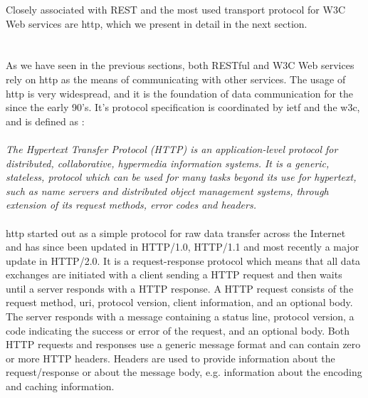Closely associated with REST and the most used transport protocol for W3C Web
services are \gls{http}, which we present in detail in the next section.


\section{}

As we have seen in the previous sections, both RESTful and W3C Web services rely
on \gls{http} as the means of communicating with other services. The usage of
\gls{http} is very widespread, and it is the foundation of data communication
for the  since the early 90's. It's protocol specification is
coordinated by \gls{ietf} and the \gls{w3c}, and is defined as \cite{rfc-2616}:

\paragraph{}
\textit{
    The Hypertext Transfer Protocol (HTTP) is an application-level
    protocol for distributed, collaborative, hypermedia information
    systems. It is a generic, stateless, protocol which can be used for
    many tasks beyond its use for hypertext, such as name servers and
    distributed object management systems, through extension of its
    request methods, error codes and headers.
}

\paragraph{}

\gls{http} started out as a simple protocol for raw data transfer across the
Internet and has since been updated in HTTP/1.0, HTTP/1.1 and most recently a
major update in HTTP/2.0. It is a request-response protocol which means that all
data exchanges are initiated with a client sending a HTTP request and then waits
until a server responds with a HTTP response. A HTTP request consists of the
request method, \gls{uri}, protocol version, client information, and an optional
body. The server responds with a message containing a status line, protocol
version, a code indicating the success or error of the request, and an optional
body. Both HTTP requests and responses use a generic message format and can
contain zero or more HTTP headers. Headers are used to provide information about
the request/response or about the message body, e.g. information about the
encoding and caching information.

